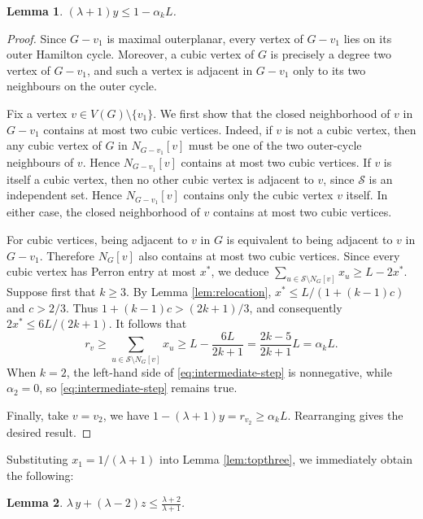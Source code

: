 \documentclass[11pt]{article}
\theoremstyle{plain}
\newtheorem{lemma}{Lemma}[section]
\theoremstyle{definition}
\numberwithin{equation}{section}
\begin{document}
\begin{lemma}\label{lem:outer-ear-mass}
$(\lambda + 1)y \leq 1 - \alpha_k L$.
\end{lemma}

\begin{proof}
Since $G-v_1$ is maximal outerplanar, every vertex of $G-v_1$ lies on its outer Hamilton cycle. 
Moreover, a cubic vertex of $G$ is precisely a degree two vertex of $G-v_1$, and such a vertex 
is adjacent in $G-v_1$ only to its two neighbours on the outer cycle.

Fix a vertex $v\in V(G)\setminus\{v_1\}$. We first show that the closed neighborhood of $v$ in 
$G-v_1$ contains at most two cubic vertices. Indeed,
if $v$ is not a cubic vertex, then any cubic vertex of $G$ in $N_{G-v_1}[v]$ must be one of 
the two outer-cycle neighbours of $v$. Hence $N_{G-v_1}[v]$ contains at most two cubic vertices. If 
$v$ is itself a cubic vertex, then no other cubic vertex is adjacent to $v$, since $\mathcal{S}$ 
is an independent set. Hence $N_{G-v_1}[v]$ contains only the cubic vertex $v$ itself.
In either case, the closed neighborhood of $v$ contains at most two cubic vertices.

For cubic vertices, being adjacent to $v$ in $G$ is equivalent to being
adjacent to $v$ in $G-v_1$. Therefore $N_G[v]$ also contains at most two cubic vertices. 
Since every cubic vertex has Perron entry at most $x^*$, we deduce 
$\sum_{u\in \mathcal{S}\setminus N_G[v]} x_u\geq L - 2x^*$. Suppose first that $k\geq 3$. By Lemma \ref{lem:relocation},
$x^*\leq L/(1+(k-1)c)$ and $c > 2/3$. Thus $1+(k-1)c > (2k+1)/3$, and consequently
$2x^*\leq 6L/(2k+1)$. It follows that
\begin{equation}\label{eq:intermediate-step}
r_v\geq\sum_{u\in \mathcal{S}\setminus N_G[v]} x_u
\geq L - \frac{6L}{2k+1} = \frac{2k-5}{2k+1}L = \alpha_kL.
\end{equation}
When $k=2$, the left-hand side of \eqref{eq:intermediate-step} is nonnegative, while
$\alpha_2 = 0$, so \eqref{eq:intermediate-step} remains true.

Finally, take $v=v_2$, we have $1 - (\lambda + 1) y = r_{v_2}\geq \alpha_k L$.
Rearranging gives the desired result.
\end{proof}

Substituting $x_1 = 1/(\lambda + 1)$ into Lemma \ref{lem:topthree}, we immediately obtain the following:

\begin{lemma}\label{lem:lambda-y+lambda-z}
$\lambda\, y + (\lambda - 2) z
\leq \frac{\lambda + 2}{\lambda + 1}$. 
\end{lemma}
\end{document}
